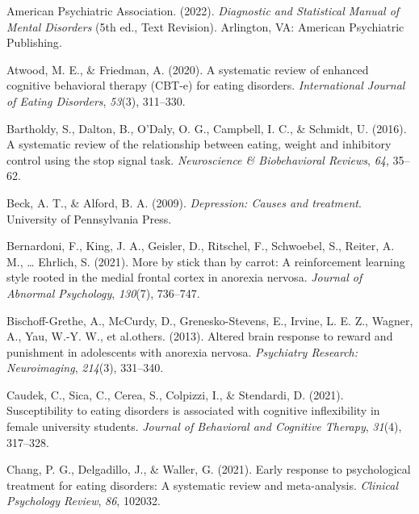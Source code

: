 \documentclass[
  man,floatsintext]{apa6}
\newlength{\cslhangindent}
\newlength{\cslentryspacingunit} %
\newenvironment{CSLReferences}[2] %
 {%
  \setlength{\parindent}{0pt}
  \ifodd #1
  \let\oldpar\par
  \def\par{\hangindent=\cslhangindent\oldpar}
  \fi
  \setlength{\parskip}{#2\cslentryspacingunit}
 }%
 {}
\begin{document}
\hypertarget{refs}{}
\begin{CSLReferences}{1}{0}
\leavevmode{}%
American Psychiatric Association. (2022). \emph{{Diagnostic and Statistical Manual of Mental Disorders}} (5th ed., Text Revision). Arlington, VA: {American Psychiatric Publishing}.

\leavevmode{}%
Atwood, M. E., \& Friedman, A. (2020). A systematic review of enhanced cognitive behavioral therapy (CBT-e) for eating disorders. \emph{International Journal of Eating Disorders}, \emph{53}(3), 311--330.

\leavevmode{}%
Bartholdy, S., Dalton, B., O'Daly, O. G., Campbell, I. C., \& Schmidt, U. (2016). A systematic review of the relationship between eating, weight and inhibitory control using the stop signal task. \emph{Neuroscience \& Biobehavioral Reviews}, \emph{64}, 35--62.

\leavevmode{}%
Beck, A. T., \& Alford, B. A. (2009). \emph{Depression: Causes and treatment}. University of Pennsylvania Press.

\leavevmode{}%
Bernardoni, F., King, J. A., Geisler, D., Ritschel, F., Schwoebel, S., Reiter, A. M., \ldots{} Ehrlich, S. (2021). More by stick than by carrot: A reinforcement learning style rooted in the medial frontal cortex in anorexia nervosa. \emph{Journal of Abnormal Psychology}, \emph{130}(7), 736--747.

\leavevmode{}%
Bischoff-Grethe, A., McCurdy, D., Grenesko-Stevens, E., Irvine, L. E. Z., Wagner, A., Yau, W.-Y. W., et al.others. (2013). Altered brain response to reward and punishment in adolescents with anorexia nervosa. \emph{Psychiatry Research: Neuroimaging}, \emph{214}(3), 331--340.

\leavevmode{}%
Caudek, C., Sica, C., Cerea, S., Colpizzi, I., \& Stendardi, D. (2021). Susceptibility to eating disorders is associated with cognitive inflexibility in female university students. \emph{Journal of Behavioral and Cognitive Therapy}, \emph{31}(4), 317--328.

\leavevmode{}%
Chang, P. G., Delgadillo, J., \& Waller, G. (2021). Early response to psychological treatment for eating disorders: A systematic review and meta-analysis. \emph{Clinical Psychology Review}, \emph{86}, 102032.


\end{CSLReferences}
\end{document}
